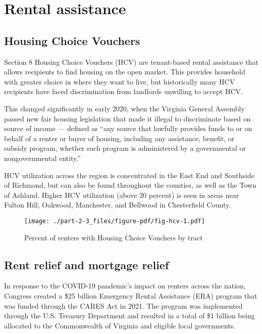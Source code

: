 \documentclass[
  letterpaper,
  DIV=11,
  numbers=noendperiod]{scrreprt}
\begin{document}
\hypertarget{rental-assistance}{%
\section{Rental assistance}\label{rental-assistance}}

\hypertarget{housing-choice-vouchers}{%
\subsection{Housing Choice Vouchers}\label{housing-choice-vouchers}}

Section 8 Housing Choice Vouchers (HCV) are tenant-based rental
assistance that allows recipients to find housing on the open market.
This provides household with greater choice in where they want to live,
but historically many HCV recipients have faced discrimination from
landlords unwilling to accept HCV.

This changed significantly in early 2020, when the Virginia General
Assembly passed new fair housing legislation that made it illegal to
discriminate based on source of income --- defined as ``any source that
lawfully provides funds to or on behalf of a renter or buyer of housing,
including any assistance, benefit, or subsidy program, whether such
program is administered by a governmental or nongovernmental entity.''

HCV utilization across the region is concentrated in the East End and
Southside of Richmond, but can also be found throughout the counties, as
well as the Town of Ashland. Higher HCV utilization (above 20 percent)
is seen in areas near Fulton Hill, Oakwood, Manchester, and Bellwood in
Chesterfield County.

\begin{figure}

{\centering \texttt{[image: ./part-2-3\_files/figure-pdf/fig-hcv-1.pdf]}

}

\caption{\label{fig-hcv}Percent of renters with Housing Choice Vouchers
by tract}

\end{figure}

\hypertarget{rent-relief-and-mortgage-relief}{%
\subsection{Rent relief and mortgage
relief}\label{rent-relief-and-mortgage-relief}}

In response to the COVID-19 pandemic's impact on renters across the
nation, Congress created a \$25 billion Emergency Rental Assistance
(ERA) program that was funded through the CARES Act in 2021. The program
was implemented through the U.S. Treasury Department and resulted in a
total of \$1 billion being allocated to the Commonwealth of Virginia and
eligible local governments.
\end{document}
